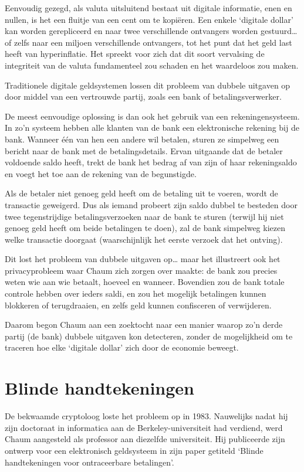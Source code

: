 \documentclass[smalldemyvopaper,11pt,twoside,onecolumn,openright,extrafontsizes,hidelinks]{memoir}
\begin{document}
Eenvoudig gezegd, als valuta uitsluitend bestaat uit digitale
informatie, enen en nullen, is het een fluitje van een cent om te
kopiëren. Een enkele `digitale dollar' kan worden gerepliceerd en naar
twee verschillende ontvangers worden gestuurd\ldots{} of zelfs naar een
miljoen verschillende ontvangers, tot het punt dat het geld last heeft
van hyperinflatie. Het spreekt voor zich dat dit soort vervalsing de
integriteit van de valuta fundamenteel zou schaden en het waardeloos zou
maken.

Traditionele digitale geldsystemen lossen dit probleem van dubbele
uitgaven op door middel van een vertrouwde partij, zoals een bank of
betalingsverwerker.

De meest eenvoudige oplossing is dan ook het gebruik van een
rekeningensysteem. In zo'n systeem hebben alle klanten van de bank een
elektronische rekening bij de bank. Wanneer één van hen een andere wil
betalen, sturen ze simpelweg een bericht naar de bank met de
betalingsdetails. Ervan uitgaande dat de betaler voldoende saldo heeft,
trekt de bank het bedrag af van zijn of haar rekeningsaldo en voegt het
toe aan de rekening van de begunstigde.

Als de betaler niet genoeg geld heeft om de betaling uit te voeren,
wordt de transactie geweigerd. Dus als iemand probeert zijn saldo dubbel
te besteden door twee tegenstrijdige betalingsverzoeken naar de bank te
sturen (terwijl hij niet genoeg geld heeft om beide betalingen te doen),
zal de bank simpelweg kiezen welke transactie doorgaat (waarschijnlijk
het eerste verzoek dat het ontving).

Dit lost het probleem van dubbele uitgaven op\ldots{} maar het
illustreert ook het privacyprobleem waar Chaum zich zorgen over maakte:
de bank zou precies weten wie aan wie betaalt, hoeveel en wanneer.
Bovendien zou de bank totale controle hebben over ieders saldi, en zou
het mogelijk betalingen kunnen blokkeren of terugdraaien, en zelfs geld
kunnen confisceren of verwijderen.

Daarom begon Chaum aan een zoektocht naar een manier waarop zo'n derde
partij (de bank) dubbele uitgaven kon detecteren, zonder de mogelijkheid
om te traceren hoe elke `digitale dollar' zich door de economie beweegt.

\section{Blinde handtekeningen}\label{blinde-handtekeningen}

De bekwaamde cryptoloog loste het probleem op in 1983. Nauwelijks nadat
hij zijn doctoraat in informatica aan de Berkeley-universiteit had
verdiend, werd Chaum aangesteld als professor aan diezelfde
universiteit. Hij publiceerde zijn ontwerp voor een elektronisch
geldsysteem in zijn paper getiteld `Blinde handtekeningen voor
ontraceerbare betalingen'.
\end{document}
